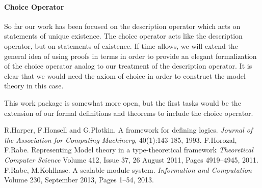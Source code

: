 \documentclass[a4paper,10pt]{article}
\begin{document}
\paragraph{Choice Operator} So far our work has been focused on the description operator which acts on statements of unique existence. The choice operator acts like the description operator, but on statements of existence. If time allows, we will extend the general idea of using proofs in terms in order to provide an elegant formalization of the choice operator analog to our treatment of the description operator. It is clear that we would need the axiom of choice in order to construct the model theory in this case.

 This work package is somewhat more open, but the first tasks would be the extension of our formal definitions and theorems to include the choice operator.\\



\begin{thebibliography}{9}
  R.Harper, F.Honsell and G.Plotkin. A framework for defining logics.
  \emph{Journal of the Association for Computing Machinery}, 40(1):143-185, 1993.
 F.Horozal, F.Rabe. Representing Model theory in a type-theoretical framework
  \emph{Theoretical Computer Science}
  Volume 412, Issue 37, 26 August 2011, Pages 4919–4945, 2011.
 F.Rabe, M.Kohlhase. A scalable module system. 
  \emph{Information and Computation} Volume 230, September 2013, Pages 1–54, 2013.
\end{thebibliography}
\end{document}
